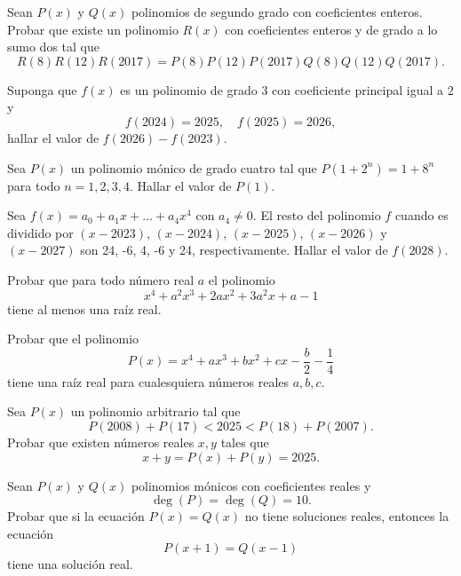 \begin{problem}
    Sean $P(x)$ y $Q(x)$ polinomios de segundo grado con coeficientes enteros.
    Probar que existe un polinomio $R(x)$ con coeficientes enteros y de grado a lo sumo dos tal que
    \[
        R(8)R(12)R(2017) = P(8)P(12)P(2017)Q(8)Q(12)Q(2017).
    \]
\end{problem}

\begin{problem}
    Suponga que $f(x)$ es un polinomio de grado 3 con coeficiente principal igual a 2 y
    \[
        f(2024) = 2025, \quad f(2025) = 2026,
    \]
    hallar el valor de $f(2026) - f(2023)$.
\end{problem}

\begin{problem}
    Sea $P(x)$ un polinomio mónico de grado cuatro tal que $P(1 + 2^n) = 1 + 8^n$ para todo $n = 1, 2, 3, 4$.
    Hallar el valor de $P(1)$.
\end{problem}

\begin{problem}
    Sea $f(x) = a_0 + a_1 x + \ldots + a_4 x^4$ con $a_4 \neq 0$.
    El resto del polinomio $f$ cuando es dividido por $(x - 2023)$, $(x - 2024)$, $(x - 2025)$, $(x - 2026)$ y $(x - 2027)$ son 24, -6, 4, -6 y 24, respectivamente.
    Hallar el valor de $f(2028)$.
\end{problem}

\begin{problem}
    Probar que para todo número real $a$ el polinomio
    \[
        x^4 + a^2 x^3 + 2ax^2 + 3a^2 x + a - 1
    \]
    tiene al menos una raíz real.
\end{problem}

\begin{problem}
    Probar que el polinomio
    \[
        P(x) = x^4 + ax^3 + bx^2 + c x - \frac{b}{2} - \frac{1}{4}
    \]
    tiene una raíz real para cualesquiera números reales $a,b,c$.
\end{problem}

\begin{problem}
    Sea $P(x)$ un polinomio arbitrario tal que
    \[
        P(2008) + P(17) < 2025 < P(18) + P(2007).
    \]
    Probar que existen números reales $x,y$ tales que
    \[
        x + y = P(x) + P(y) = 2025.
    \]
\end{problem}

\begin{problem}
    Sean $P(x)$ y $Q(x)$ polinomios mónicos con coeficientes reales y
    \[
        \deg(P) = \deg(Q) = 10.
    \]
    Probar que si la ecuación $P(x) = Q(x)$ no tiene soluciones reales, entonces la ecuación
    \[
        P(x + 1) = Q(x - 1)
    \]
    tiene una solución real.
\end{problem}